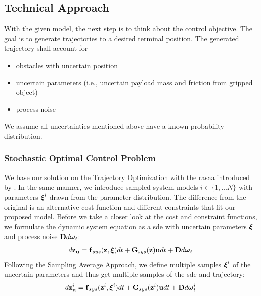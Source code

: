 \documentclass[a4paper,11pt]{article}
\let\oldsection\section
\renewcommand\section{\clearpage\oldsection}
\newcommand{\Mat}[1]{\mathbf{\MakeUppercase{#1}}}
\renewcommand{\vec}[1]{\boldsymbol{\mathbf{\MakeLowercase{#1}}}}
\begin{document}
\subsection{Technical Approach}
\label{sec:method}



With the given model, the next step is to think about the control objective. The goal is to generate trajectories to a desired terminal position. The generated trajectory shall account for
\begin{itemize}
	\item obstacles with uncertain position
	\item uncertain parameters (i.e., uncertain payload mass and friction from gripped object)
	\item process noise
\end{itemize}
We assume all uncertainties mentioned above have a known probability distribution.

\subsubsection{Stochastic Optimal Control Problem}	
We base our solution on the Trajectory Optimization with the \gls{rasaa} introduced by \cite{lew2023risk}. In the same manner, we introduce sampled system models $i \in \{1, \dots N\}$ with parameters $\vec{\xi}^i$ drawn from the parameter distribution. The difference from the original is an alternative cost function and different constraints that fit our proposed model. Before we take a closer look at the cost and constraint functions, we formulate the dynamic system equation as a \gls{sde} with uncertain parameters $\vec{\xi}$ and process noise $\Mat{D} d \vec{\omega}_t$:
\begin{equation}
	\label{eqSDE}
	d\vec{z}_{\vec{u}} = \vec{f}_{sys}(\vec z, \vec{\xi}) dt + \Mat{G}_{sys}(\vec{z}) \vec{u} dt + \Mat{D} d \vec{\omega}_t
\end{equation}
Following the Sampling Average Approach, we define multiple samples $\vec{\xi}^i$ of the uncertain parameters and thus get multiple samples of the \gls{sde} and trajectory:
\begin{equation}
	\label{eqSDEsampled}
	d\vec{z}^i_{\vec{u}} = \vec{f}_{sys}(\vec z^i, \vec{\xi}^i) dt + \Mat{G}_{sys}(\vec{z}^i) \vec{u} dt + \Mat{D} d \vec{\omega}_t^i
\end{equation}
\end{document}
